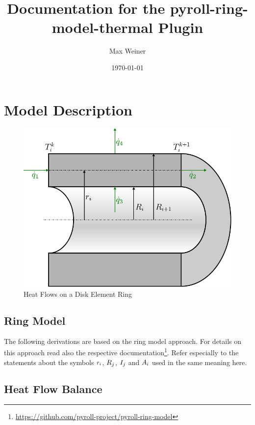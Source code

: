 \documentclass{PyRollDocs}
\begin{document}
    \title{Documentation for the pyroll-ring-model-thermal Plugin}
    \author{Max Weiner}
    \date{\today}

    \maketitle


    \section{Model Description}\label{sec:model-description}

    \begin{figure}
        \centering
        \includegraphics[scale=0.8]{img/heat_flow}
        \caption{Heat Flows on a Disk Element Ring}
        \label{fig:heat_flow}
    \end{figure}

    \subsection{Ring Model}\label{subsec:ring-model}

    The following derivations are based on the ring model approach.
    For details on this approach read also the respective documentation\footnote{\url{https://github.com/pyroll-project/pyroll-ring-model}}.
    Refer especially to the statements about the symbols ${r}_{{i}}$, ${R}_{j}$, ${I}_{j}$ and ${A}_{i}$ used in the same meaning here.

    \subsection{Heat Flow Balance}\label{subsec:heat-flow-balance}
\end{document}
